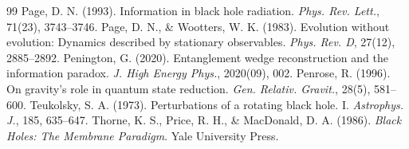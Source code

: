 \documentclass[11pt,a4paper]{article}
\begin{document}
\begin{thebibliography}{99}
 Page, D. N. (1993). Information in black hole radiation. \textit{Phys. Rev. Lett.}, 71(23), 3743--3746.
 Page, D. N., \& Wootters, W. K. (1983). Evolution without evolution: Dynamics described by stationary observables. \textit{Phys. Rev. D}, 27(12), 2885--2892.
 Penington, G. (2020). Entanglement wedge reconstruction and the information paradox. \textit{J. High Energy Phys.}, 2020(09), 002.
 Penrose, R. (1996). On gravity's role in quantum state reduction. \textit{Gen. Relativ. Gravit.}, 28(5), 581--600.
 Teukolsky, S. A. (1973). Perturbations of a rotating black hole. I. \textit{Astrophys. J.}, 185, 635--647.
 Thorne, K. S., Price, R. H., \& MacDonald, D. A. (1986). \textit{Black Holes: The Membrane Paradigm}. Yale University Press.
\end{thebibliography}
\end{document}

